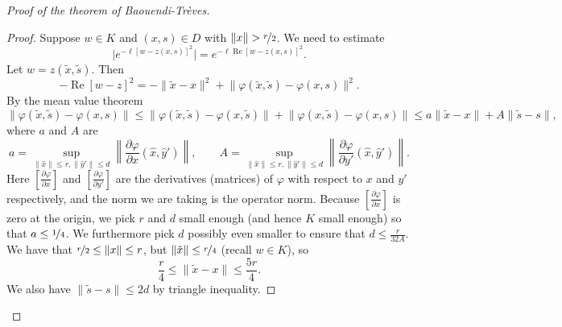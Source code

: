 \documentclass[12pt,openany]{book}
\renewcommand{\Re}{\operatorname{Re}}
\newcommand{\snorm}[1]{\lVert {#1} \rVert}
\newcommand{\babs}[1]{\bigl\lvert {#1} \bigr\rvert}
\newcommand{\norm}[1]{\left\lVert {#1} \right\rVert}
\theoremstyle{plain}
\theoremstyle{remark}
\theoremstyle{definition}
\theoremstyle{exercise}
\theoremstyle{example}
\begin{document}
\begin{proof}[Proof of the theorem of Baouendi-Tr{\`e}ves]
\begin{proof}
Suppose $w \in K$ and $(x,s) \in D$ with $\snorm{x} > \nicefrac{r}{2}$.  We need to estimate
\begin{equation*}
\babs{e^{ -\ell {[w - z(x,s)]}^2 }} =
e^{ -\ell \Re {[w - z(x,s)]}^2 } .
\end{equation*}
Let $w = z(\tilde{x},\tilde{s})$.  Then
\begin{equation*}
-\Re {[w - z]}^2 =
-\snorm{\tilde{x}-x}^2
+
\snorm{\varphi(\tilde{x},\tilde{s})-\varphi(x,s)}^2 .
\end{equation*}
By the mean value theorem
\begin{equation*}
\snorm{\varphi(\tilde{x},\tilde{s})-\varphi(x,s)}
\leq
\snorm{\varphi(\tilde{x},\tilde{s})-\varphi(x,\tilde{s})}
+
\snorm{\varphi(x,\tilde{s})-\varphi(x,s)}
\leq
a \snorm{\tilde{x}-x}
+
A \snorm{\tilde{s}-s} ,
\end{equation*}
where $a$ and $A$ are 
\begin{equation*}
a = \sup_{\snorm{\hat{x}} \leq r, \snorm{\hat{y}'} \leq d}
\norm{\frac{\partial \varphi}{\partial x}(\hat{x},\hat{y}')},
\qquad
A = \sup_{\snorm{\hat{x}} \leq r, \snorm{\hat{y}'} \leq d}
\norm{\frac{\partial \varphi}{\partial y'}(\hat{x},\hat{y}')}.
\end{equation*}
Here $\left[ \frac{\partial \varphi}{\partial x} \right]$ and 
$\left[ \frac{\partial \varphi}{\partial y'} \right]$ are
the derivatives (matrices) of $\varphi$ with respect to $x$ and $y'$
respectively, and the norm we are taking is the operator norm.
Because $\left[ \frac{\partial \varphi}{\partial x} \right]$ is zero
at the origin, we pick $r$ and $d$ small
enough (and hence $K$ small enough) so that $a \leq \nicefrac{1}{4}$.
We furthermore pick $d$ possibly even smaller to ensure
that $d \leq \frac{r}{32A}$.  We have that $\nicefrac{r}{2} \leq \snorm{x} \leq
r$, but $\snorm{\tilde{x}} \leq \nicefrac{r}{4}$ (recall $w \in K$), so
\begin{equation*}
\frac{r}{4} \leq \snorm{\tilde{x}-x} \leq \frac{5r}{4} .
\end{equation*}
We also have $\snorm{\tilde{s}-s} \leq 2d$ by triangle inequality.


\end{proof}
\end{proof}
\end{document}
